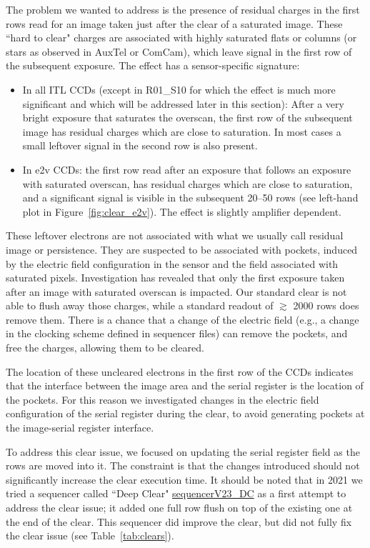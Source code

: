 The problem we wanted to address is the presence of residual charges in
the first rows read for an image taken just after the clear of a saturated
image. These ``hard to clear" charges are associated with highly
saturated flats or columns (or stars as observed in AuxTel or ComCam),
which leave signal in the first row of the subsequent exposure. The effect has a sensor-specific signature:

\begin{itemize}
\item
  In all ITL CCDs (except in R01\_S10 for which the effect is much more significant and which will be addressed later in this section): After a very bright exposure that saturates the overscan, the first row of the subsequent image has residual charges which are close to saturation. In most cases a small leftover signal in the second row is also present.
\item
  In e2v CCDs: the first row read after an exposure that follows an exposure with saturated
  overscan, has residual charges which are close to saturation, and a significant signal is visible
  in the subsequent 20--50 rows (see left-hand plot in Figure~\ref{fig:clear_e2v}).
  The effect is slightly amplifier dependent.
\end{itemize}

These leftover electrons are not associated with what we usually call residual image or persistence. They are suspected to be associated with pockets, induced by the electric field configuration in the sensor and the field associated with saturated pixels.
Investigation has revealed that only the first exposure taken after an image with saturated overscan is impacted. Our standard clear is not able to flush away those charges, while a standard readout of $\gtrsim$ 2000 rows does remove them.
There is a chance that a change of the electric field (e.g., a change in the clocking scheme defined in sequencer files) can remove the pockets, and free the charges, allowing them to be cleared.

The location of these uncleared electrons in the first row of the
CCDs indicates that the interface between the image area and the serial register
is the location of the pockets. For this reason we investigated
changes in the electric field configuration of the serial register during the
clear, to avoid generating pockets at the image-serial register interface.


To address this clear issue, we focused on updating the serial
register field as the rows are moved into it. The constraint is that
the changes introduced should not significantly increase the clear
execution time. It should be noted that in 2021 we tried a sequencer
called ``Deep Clear" \href{https://github.com/lsst-camera-dh/sequencer-files/blob/master/run5/FP_E2V_2s_ir2_v23_DC.seq}{sequencerV23\_DC} as a first attempt to address the clear issue; it added one full row 
flush on top of the existing one at the end of the clear. This sequencer
did improve the clear, but did  not fully fix the clear issue (see
Table~\ref{tab:clears}).

